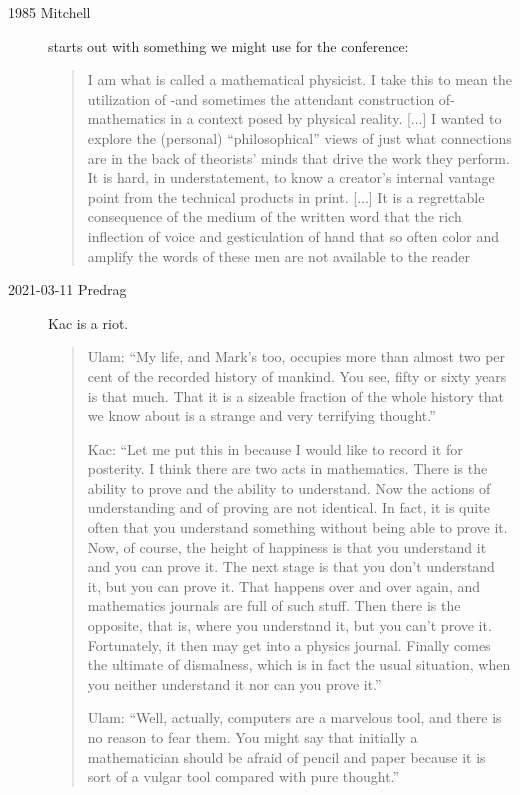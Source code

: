 \begin{description}
  \item[1985 Mitchell]
starts out with something we might use for the conference:
\begin{quote}
I am what is called a mathematical physicist. I take this to mean the
utilization of -and sometimes the attendant construction of- mathematics
in a context posed by physical reality.
[...]
I wanted to explore the (personal) ``philosophical'' views of just what
connections are in the back of theorists' minds that drive the work they
perform. It is hard, in understatement, to know a creator's internal
vantage point from the technical products in print.
[...]
It is a regrettable consequence of the medium of the
written word that the rich inflection of voice and gesticulation of
hand that so often color and amplify the words of these men are not
available to the reader
\end{quote}

  \item[2021-03-11 Predrag]
Kac is a riot.
\begin{quote}
Ulam: ``My life, and Mark's too, occupies more than almost two per cent
of the recorded history of mankind. You see, fifty or sixty years is that
much. That it is a sizeable fraction of the whole history that we know
about is a strange and very terrifying thought.''

Kac: ``Let me put this in because I would like to
record it for posterity. I think there are two acts in mathematics.
There is the ability to prove and the ability to understand. Now the
actions of understanding and of proving are not identical. In fact, it is
quite often that you understand something without being able to
prove it. Now, of course, the height of happiness is that you
understand it and you can prove it. The next stage is that you don't
understand it, but you can prove it. That happens over and over
again, and mathematics journals are full of such stuff. Then there is
the opposite, that is, where you understand it, but you can't prove it.
Fortunately, it then may get into a physics journal. Finally comes the
ultimate of dismalness, which is in fact the usual situation, when you
neither understand it nor can you prove it.''

Ulam: ``Well, actually, computers are a marvelous tool, and there is
no reason to fear them. You might say that initially a mathematician
should be afraid of pencil and paper because it is sort of a vulgar tool
compared with pure thought.''


\end{quote}
\end{description}
